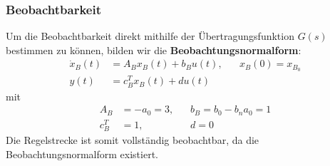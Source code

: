 \documentclass[11pt]{scrartcl} %
\begin{document}
\subsubsection*{Beobachtbarkeit}
Um die Beobachtbarkeit direkt mithilfe der Übertragungsfunktion $G(s)$ bestimmen zu können, bilden wir die \textbf{Beobachtungsnormalform}:
\begin{align*}
	\dot{x}_B(t)&=A_Bx_B(t)+b_Bu(t),\hspace{20pt}x_B(0)=x_{B_0}\\
	y(t)&=c^T_Bx_B(t)+du(t)
\end{align*}
mit
\begin{align*}
	A_B&=-a_0=3,\hspace{10pt}&b_B=b_0-b_na_0=1\\
	c^T_B&=1,&d=0
\end{align*}
Die Regelstrecke ist somit vollständig beobachtbar, da die Beobachtungsnormalform existiert.
\end{document}
